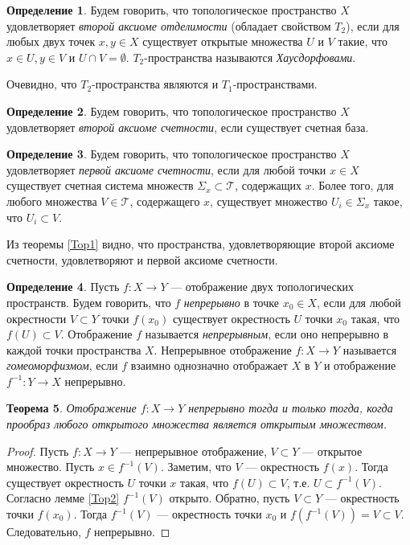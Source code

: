 \documentclass[12pt, titlepage, oneside]{amsbook}
\newcommand{\TTT}{{\mathcal T}}
\newtheorem{theorem}{Теорема}[chapter]
\theoremstyle{definition}
\newtheorem{definition}[theorem]{Определение}
\theoremstyle{remark}
\begin{document}
\begin{definition}
Будем говорить, что топологическое пространство $X$ удовлетворяет \emph{второй аксиоме отделимости} (обладает свойством $T_2$), если для любых двух точек $x,y\in X$ существует открытые множества $U$ и $V$ такие, что $x\in U, y\in V$ и $U\cap V=\emptyset$. $T_2$-пространства называются \emph{Хаусдорфовами}.
\end{definition}

Очевидно, что $T_2$-пространства являются и $T_1$-пространствами.

\begin{definition}
Будем говорить, что топологическое пространство $X$ удовлетворяет \emph{второй аксиоме счетности}, если существует счетная база.
\end{definition}

\begin{definition}
Будем говорить, что топологическое пространство $X$ удовлетворяет \emph{первой аксиоме счетности}, если для любой точки $x\in X$ существует счетная система множеств $\Sigma_x\subset\TTT$, содержащих $x$. Более того, для любого множества $V\in\TTT$, содержащего $x$, существует множество $U_i\in\Sigma_x$ такое, что $U_i\subset V$.
\end{definition}

Из теоремы \ref{Top1} видно, что пространства, удовлетворяющие второй аксиоме счетности, удовлетворяют и первой аксиоме счетности.

\begin{definition}
Пусть $f\colon X\rightarrow Y$ --- отображение двух топологических пространств. Будем говорить, что $f$ \emph{непрерывно} в точке $x_0\in X$, если для любой окрестности $V\subset Y$ точки $f(x_0)$ существует окрестность $U$ точки $x_0$ такая, что $f(U)\subset V$. Отображение $f$ называется \emph{непрерывным}, если оно непрерывно в каждой точки пространства $X$. Непрерывное отображение $f\colon X\rightarrow Y$ называется \emph{гомеоморфизмом}, если $f$ взаимно однозначно отображает $X$ в $Y$ и отображение $f^{-1}\colon Y\rightarrow X$ непрерывно.
\end{definition}

\begin{theorem}
\label{Top3}
Отображение $f\colon X\rightarrow Y$ непрерывно тогда и только тогда, когда прообраз любого открытого множества является открытым множеством.
\end{theorem}

\begin{proof}
Пусть $f\colon X\rightarrow Y$  --- непрерывное отображение, $V\subset Y$ --- открытое множество. Пусть $x\in f^{-1}(V)$. Заметим, что $V$ --- окрестность $f(x)$. Тогда существует окрестность $U$ точки $x$ такая, что $f(U)\subset V$, т.е. $U\subset f^{-1}(V)$. Согласно лемме \ref{Top2} $f^{-1}(V)$ открыто.
Обратно, пусть $V\subset Y$ --- окрестность точки $f(x_0)$. Тогда $f^{-1}(V)$ --- окрестность точки $x_0$ и $f(f^{-1}(V))=V\subset V$. Следовательно, $f$ непрерывно.
\end{proof}
\end{document}
